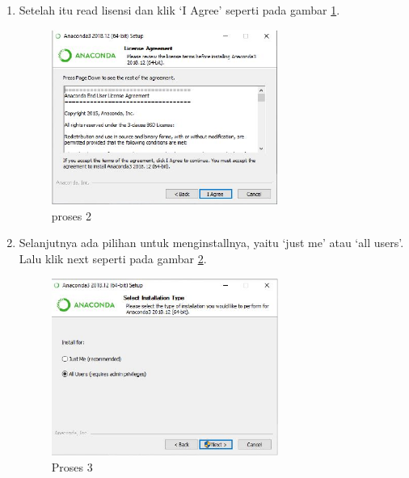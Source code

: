 \begin{itemize}
\begin{enumerate}
\item Setelah itu read lisensi dan klik `I Agree' seperti pada gambar \ref{gambar2}.
\begin{figure}[ht]
	\centerline{\includegraphics[width=0.70\textwidth]{figures/1/1144124/b.JPG}}
	\caption{proses 2 }
	\label{gambar2}
\end{figure}

\item Selanjutnya ada pilihan untuk menginstallnya, yaitu `just me' atau `all users'. Lalu klik next seperti pada gambar \ref{gambar3}.
\begin{figure}[ht]
	\centerline{\includegraphics[width=0.70\textwidth]{figures/1/1144124/c.JPG}}
	\caption{Proses 3 }
	\label{gambar3}
\end{figure}


\end{enumerate}
\end{itemize}
